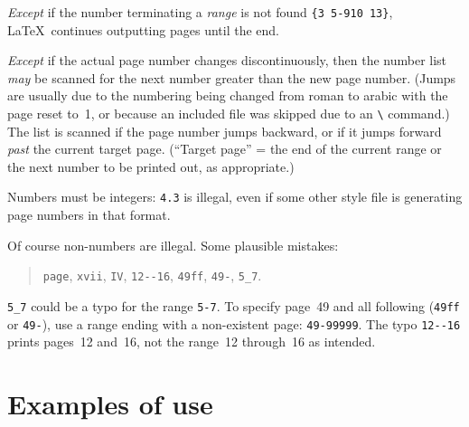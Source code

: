 \documentclass[pagesize=auto, fontsize=12pt]{scrartcl}
\makeatletter
\newcommand*{\cs}[1]{\texttt{\textbackslash#1}}
\newcommand*{\cmd}[1]{\cs{\expandafter\@gobble\string#1}}
\makeatother
\begin{document}
\emph{Except} if the number terminating a \emph{range} is not found \verb*|{3 5-910 13}|,
\LaTeX\ continues outputting pages until the end.

\emph{Except} if the actual page number changes discontinuously, then the number
list \emph{may} be scanned for the next number greater than the new page number.
(Jumps are usually due to the numbering being changed from roman to arabic
with the page reset to~1, or because an included file was skipped due to
an \cmd{} command.) The list is scanned if the page number jumps
backward, or if it jumps forward \emph{past} the current target page. (``Target
page'' = the end of the current range or the next number to be printed out,
as appropriate.) 

Numbers must be integers: \texttt{4.3} is illegal, even if some other style file
is generating page numbers in that format.

\pagebreak[1]

Of course non-numbers are illegal.  Some plausible mistakes:
%
\begin{quote}
  \verb|page|, \verb|xvii|, \verb|IV|, \verb|12--16|, \verb|49ff|, \verb|49-|, \verb|5_7|.  
\end{quote}
%
\verb|5_7| could be a typo for the range \verb|5-7|.
To specify page~49 and all following (\verb|49ff| or \verb|49-|), use a range 
ending with a non-existent page:  \verb|49-99999|.
The typo \verb|12--16| prints pages~12 and~16, not the range~12 through~16 as
intended.


\section{Examples of use}
\end{document}
